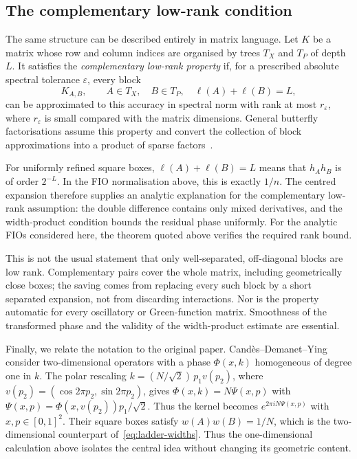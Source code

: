 \documentclass[11pt,a4paper]{article}
\numberwithin{equation}{section}
\begin{document}
\subsection{The complementary low-rank condition}
\label{subsec:complementary-low-rank}

The same structure can be described entirely in matrix language. Let $K$ be a matrix whose row and column indices are organised by trees $T_X$ and $T_P$ of depth $L$. It satisfies the \emph{complementary low-rank property} if, for a prescribed absolute spectral tolerance $\varepsilon$, every block
\begin{equation}
    K_{A,B},\qquad A\in T_X,\quad B\in T_P,
    \quad \ell(A)+\ell(B)=L,
\end{equation}
can be approximated to this accuracy in spectral norm with rank at most $r_\varepsilon$, where $r_\varepsilon$ is small compared with the matrix dimensions. General butterfly factorisations assume this property and convert the collection of block approximations into a product of sparse factors~\cite{li2015butterfly}.

For uniformly refined square boxes, $\ell(A)+\ell(B)=L$ means that $h_Ah_B$ is of order $2^{-L}$. In the FIO normalisation above, this is exactly $1/n$. The centred expansion therefore supplies an analytic explanation for the complementary low-rank assumption: the double difference contains only mixed derivatives, and the width-product condition bounds the residual phase uniformly. For the analytic FIOs considered here, the theorem quoted above verifies the required rank bound.

This is not the usual statement that only well-separated, off-diagonal blocks are low rank. Complementary pairs cover the whole matrix, including geometrically close boxes; the saving comes from replacing every such block by a short separated expansion, not from discarding interactions. Nor is the property automatic for every oscillatory or Green-function matrix. Smoothness of the transformed phase and the validity of the width-product estimate are essential.

Finally, we relate the notation to the original paper. Cand\`{e}s--Demanet--Ying consider two-dimensional operators with a phase $\Phi(x,k)$ homogeneous of degree one in $k$. The polar rescaling $k=(N/\sqrt2)\,p_1v(p_2)$, where $v(p_2)=(\cos 2\pi p_2,\sin 2\pi p_2)$, gives $\Phi(x,k)=N\Psi(x,p)$ with $\Psi(x,p)=\Phi(x,v(p_2))p_1/\sqrt2$. Thus the kernel becomes $e^{2\pi i N\Psi(x,p)}$ with $x,p\in[0,1]^2$. Their square boxes satisfy $w(A)w(B)=1/N$, which is the two-dimensional counterpart of~\eqref{eq:ladder-widths}. Thus the one-dimensional calculation above isolates the central idea without changing its geometric content.
\end{document}
